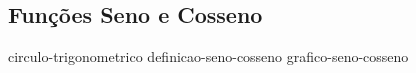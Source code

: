 \subsection{Funções Seno e Cosseno}

{circulo-trigonometrico}
{definicao-seno-cosseno}
{grafico-seno-cosseno}